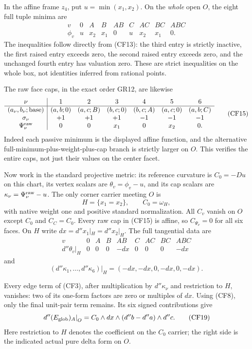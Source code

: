 In the affine frame $z_4$, put $u=\min(x_1,x_2)$.
On the \emph{whole} open $O$, the eight full tuple minima are
\[
\begin{array}{c|cccccccc}
 v&0&A&B&AB&C&AC&BC&ABC\\\hline
 \phi_v&u&x_2&x_1&0&u&x_2&x_1&0.
\end{array}
 \tag{CF14}
\]
The inequalities follow directly from (CF13): the third entry
is strictly inactive, the first raised entry exceeds zero,
the second raised entry exceeds zero, and the unchanged fourth
entry has valuation zero.  These are strict inequalities on
the whole box, not identities inferred from rational points.

The raw face caps, in the exact order GR12, are likewise
\[
\begin{array}{c|cccccc}
 \nu&1&2&3&4&5&6\\\hline
 (a_\nu,b_\nu;\text{base})
       &(a,b;0)&(a,c;B)&(b,c;0)&(b,c;A)&(a,c;0)&(a,b;C)\\
 \sigma_\nu&+1&+1&+1&-1&-1&-1\\
 \Psi_\nu^{\rm raw}&0&0&x_1&0&x_2&0.
\end{array}
 \tag{CF15}
\]
Indeed each passive minimum is the displayed affine function,
and the alternative full-minimum-plus-weight-plus-cap branch
is strictly larger on $O$.  This verifies the entire caps,
not just their values on the center facet.

Now work in the standard projective metric: its reference
curvature is $C_0=-Du$ on this chart, its vertex scalars are
$\theta_v=\phi_v-u$, and its cap scalars are
$\kappa_\nu=\Psi_\nu^{\rm raw}-u$.
The only corner carrier meeting $O$ is
\[
 H=\{x_1=x_2\},\qquad C_0=\omega_H,
 \tag{CF16}
\]
with native weight one and positive standard normalization.
All $C_v$ vanish on $O$ except $C_0$ and $C_C=C_0$.
Every raw cap in (CF15) is affine, so
$C_{\Psi_\nu}=0$ for all six faces.  On $H$ write
$dx=d''x_1|_H=d''x_2|_H$.  The full tangential data are
\[
\begin{array}{c|cccccccc}
 v&0&A&B&AB&C&AC&BC&ABC\\\hline
 d''\theta_v|_H&0&0&0&-dx&0&0&0&-dx
\end{array}
 \tag{CF17}
\]
and
\[
 (d''\kappa_1,\ldots,d''\kappa_6)|_H
                         =(-dx,-dx,0,-dx,0,-dx).
 \tag{CF18}
\]

Every edge term of (CF3), after multiplication by
$d''\kappa_\nu$ and restriction to $H$, vanishes: two of
its one-form factors are zero or multiples of $dx$.
Using (CF8), only the final unit-pair term remains.  Its
six signed contributions give
\[
 \left.d''(E_{\rm glob})_A\right|_O
       =C_0\wedge dx\wedge(d''b-d''a)\wedge d''c.
 \tag{CF19}
\]
Here restriction to $H$ denotes the coefficient on the
$C_0$ carrier; the right side is the indicated actual
pure delta form on $O$.

